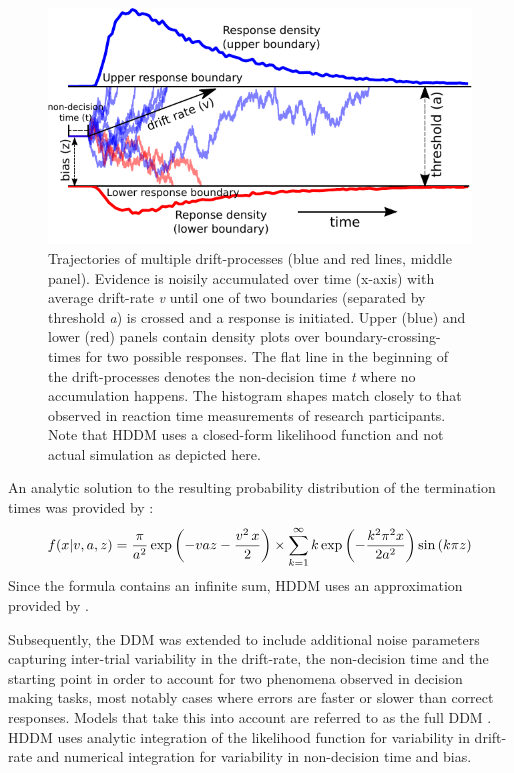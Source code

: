 \documentclass[letterpaper,10pt,english]{article}
\begin{document}
\begin{figure}
\centering
\capstart

\includegraphics{DDM.pdf}
\caption{Trajectories of multiple drift-processes (blue and red lines,
middle panel). Evidence is noisily accumulated over time (x-axis) with
average drift-rate \textit{v} until one of two boundaries (separated
by threshold \textit{a}) is crossed and a response is initiated. Upper
(blue) and lower (red) panels contain density plots over
boundary-crossing-times for two possible responses. The flat line in
the beginning of the drift-processes denotes the non-decision time
\textit{t} where no accumulation happens. The histogram shapes match
closely to that observed in reaction time measurements of research
participants. Note that HDDM uses a closed-form likelihood function
and not actual simulation as depicted here.}
\label{fig.ddm}
\end{figure}

An analytic solution to the resulting probability distribution of
the termination times was provided by \citep{Feller68}:
\begin{gather}
\begin{split}f(x|v, a, z) = \frac{\pi}{a^2} \, \text{exp} \left(
-vaz-\frac{v^2\,x}{2} \right) \times \sum_{k=1}^{\infty} k\,
\text{exp} \left( -\frac{k^2\pi^2 x}{2a^2} \right)
\text{sin}\left(k\pi z\right)\end{split}\notag
\end{gather}
Since the formula contains an infinite sum, HDDM uses an approximation
provided by \citep{NavarroFuss09}.

Subsequently, the DDM was extended to include additional noise
parameters capturing inter-trial variability in the drift-rate, the
non-decision time and the starting point in order to account for two
phenomena observed in decision making tasks, most notably cases where
errors are faster or slower than correct responses. Models that take
this into account are referred to as the full DDM
\citep{RatcliffRouder98}. HDDM uses analytic integration of the
likelihood function for variability in drift-rate and numerical
integration for variability in non-decision time and bias.
\end{document}
